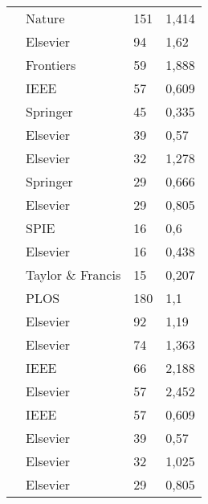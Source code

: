 \begin{longtable}{p{6.5cm}p{3.5cm}p{.3cm}p{.5cm}}
            \citet{GUO2019}               & Nature                  & 151 & 1,414 \\
            \citet{VO2019}                & Elsevier                & 94  & 1,62  \\
            \citet{XIE2019}               & Frontiers               & 59  & 1,888 \\
            \citet{LI2019}                & IEEE                    & 57  & 0,609 \\
            \citet{MURTAZA2019}           & Springer                & 45  & 0,335 \\
            \citet{DAS2019}               & Elsevier                & 39  & 0,57  \\
            \citet{MITTAL2019}            & Elsevier                & 32  & 1,278 \\
            \citet{ALOM2019}              & Springer                & 29  & 0,666 \\
            \citet{ROY2019}               & Elsevier                & 29  & 0,805 \\
            \citet{GHAZVINIANZANJANI2019} & SPIE                    & 16  & 0,6   \\
            \citet{SABEENABEEVI2019}      & Elsevier                & 16  & 0,438 \\
            \citet{ALQUDAH2019}           & Taylor \& Francis       & 15  & 0,207 \\
            \citet{CRUZROA2018}           & PLOS                    & 180 & 1,1   \\
            \citet{OLIVEIRA2018}          & Elsevier                & 92  & 1,19  \\
            \citet{GECER2018}             & Elsevier                & 74  & 1,363 \\
            \citet{ZHENG2018}             & IEEE                    & 66  & 2,188 \\
            \citet{LI2018}                & Elsevier                & 57  & 2,452 \\
            \citet{BARDOU2018}            & IEEE                    & 57  & 0,609 \\
            \citet{FONDON2018}            & Elsevier                & 39  & 0,57  \\
            \citet{GANDOMKAR2018a}        & Elsevier                & 32  & 1,025 \\
            \citet{SAHA2018a}             & Elsevier                & 29  & 0,805 \\

\end{longtable}
